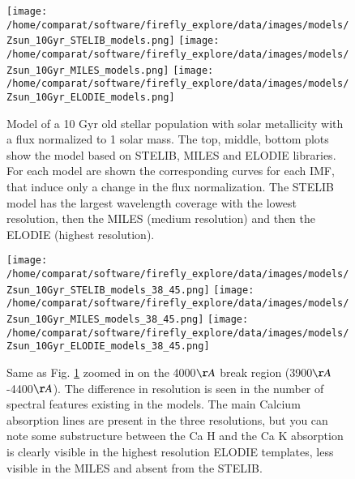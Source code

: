 \documentclass[onecolumn]{aa}
\begin{document}
\begin{figure}
\begin{center}
\caption{\label{fig:distributions:10Gyr:models} 
Model of a 10 Gyr old stellar population with solar metallicity with a flux normalized to 1 solar mass. The top, middle, bottom plots show the model based on STELIB, MILES and ELODIE libraries. 
For each model are shown the corresponding curves for each IMF, that induce only a change in the flux normalization. 
The STELIB model has the largest wavelength coverage with the lowest resolution, then the MILES (medium resolution) and then the ELODIE (highest resolution).
}  
\texttt{[image: /home/comparat/software/firefly\_explore/data/images/models/Zsun\_10Gyr\_STELIB\_models.png]}
\texttt{[image: /home/comparat/software/firefly\_explore/data/images/models/Zsun\_10Gyr\_MILES\_models.png]}
\texttt{[image: /home/comparat/software/firefly\_explore/data/images/models/Zsun\_10Gyr\_ELODIE\_models.png]}
\end{center}
\end{figure}


\begin{figure}
\begin{center}
\caption{\label{fig:distributions:10Gyr:models:zoom} 
Same as Fig. \ref{fig:distributions:10Gyr:models} zoomed in on the 4000$\AA$ break region (3900$\AA$-4400$\AA$). 
The difference in resolution is seen in the number of spectral features existing in the models. 
The main Calcium absorption lines are present in the three resolutions, but you can note some substructure between the Ca H and the Ca K absorption is clearly visible in the highest resolution ELODIE templates, less visible in the MILES and absent from the STELIB. 
}  
\texttt{[image: /home/comparat/software/firefly\_explore/data/images/models/Zsun\_10Gyr\_STELIB\_models\_38\_45.png]}
\texttt{[image: /home/comparat/software/firefly\_explore/data/images/models/Zsun\_10Gyr\_MILES\_models\_38\_45.png]}
\texttt{[image: /home/comparat/software/firefly\_explore/data/images/models/Zsun\_10Gyr\_ELODIE\_models\_38\_45.png]}
\end{center}
\end{figure}
\end{document}
